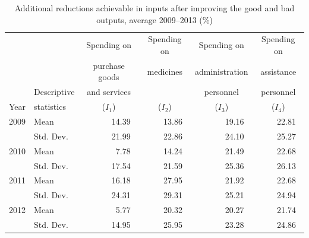 \documentclass[11pt,a4paper,oneside]{article}
\begin{document}
\begin{table}[htbp]
  \centering
  \caption{Additional reductions achievable in inputs after improving the good and bad outputs, average 2009--2013 (\%)}
    \begin{tabular}{rlrrrr}
    \toprule
          &       & \multicolumn{1}{c}{Spending on } & \multicolumn{1}{c}{Spending on } & \multicolumn{1}{c}{Spending on } & \multicolumn{1}{c}{Spending on } \\
          &       & \multicolumn{1}{c}{purchase goods } & \multicolumn{1}{c}{medicines} & \multicolumn{1}{c}{administration} & \multicolumn{1}{c}{assistance} \\
          & Descriptive & \multicolumn{1}{c}{and services} &       & \multicolumn{1}{c}{personnel} & \multicolumn{1}{c}{personnel} \\
    \multicolumn{1}{c}{Year} & statistics & \multicolumn{1}{c}{($I_1$)} & \multicolumn{1}{c}{($I_2$)} & \multicolumn{1}{c}{($I_3$)} & \multicolumn{1}{c}{($I_4$)} \\
    \midrule
    \multicolumn{1}{c}{2009} & Mean  & 14.39\ & 13.86\ & 19.16\ & 22.81\ \\
          & Std. Dev. & 21.99\ & 22.86\ & 24.10\ & 25.27\ \\
    \midrule
    \multicolumn{1}{c}{2010} & Mean  & 7.78\ & 14.24\ & 21.49\ & 22.68\ \\
          & Std. Dev. & 17.54\ & 21.59\ & 25.36\ & 26.13\ \\
    \midrule
    \multicolumn{1}{c}{2011} & Mean  & 16.18\ & 27.95\ & 21.92\ & 22.68\ \\
          & Std. Dev. & 24.31\ & 29.31\ & 25.21\ & 24.94\ \\
    \midrule
    \multicolumn{1}{c}{2012} & Mean  & 5.77\ & 20.32\ & 20.27\ & 21.74\ \\
          & Std. Dev. & 14.95\ & 25.95\ & 23.28\ & 24.86\ \\

\end{tabular}
\end{table}
\end{document}
